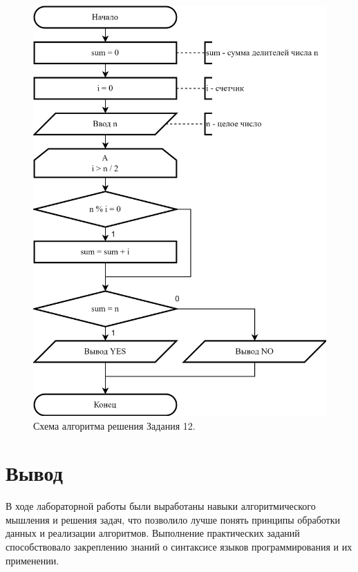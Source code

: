 \documentclass[oneside,a4paper,14pt]{extarticle}
\begin{document}
\begin{figure}
	\centering
	\includegraphics[height=0.9\textheight]{img/12-scheme.png} %
	\caption{Схема алгоритма решения Задания 12.} %
\end{figure}
\section*{Вывод}
В ходе лабораторной работы были выработаны навыки алгоритмического мышления и решения задач, что позволило лучше понять принципы обработки данных и реализации алгоритмов. Выполнение практических заданий способствовало закреплению знаний о синтаксисе языков программирования и их применении.
\end{document}

